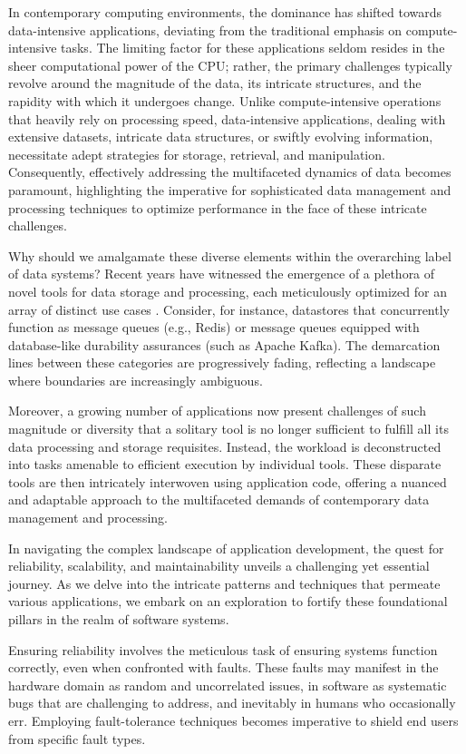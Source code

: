 
In contemporary computing environments, the dominance has shifted towards data-intensive applications, deviating from the traditional emphasis on compute-intensive tasks. The limiting factor for these applications seldom resides in the sheer computational power of the CPU; rather, the primary challenges typically revolve around the magnitude of the data, its intricate structures, and the rapidity with which it undergoes change. Unlike compute-intensive operations that heavily rely on processing speed, data-intensive applications, dealing with extensive datasets, intricate data structures, or swiftly evolving information, necessitate adept strategies for storage, retrieval, and manipulation. Consequently, effectively addressing the multifaceted dynamics of data becomes paramount, highlighting the imperative for sophisticated data management and processing techniques to optimize performance in the face of these intricate challenges.

Why should we amalgamate these diverse elements within the overarching label of data systems? Recent years have witnessed the emergence of a plethora of novel tools for data storage and processing, each meticulously optimized for an array of distinct use cases \cite{stonebraker2005onesize}. Consider, for instance, datastores that concurrently function as message queues (e.g., Redis) or message queues equipped with database-like durability assurances (such as Apache Kafka). The demarcation lines between these categories are progressively fading, reflecting a landscape where boundaries are increasingly ambiguous.

Moreover, a growing number of applications now present challenges of such magnitude or diversity that a solitary tool is no longer sufficient to fulfill all its data processing and storage requisites. Instead, the workload is deconstructed into tasks amenable to efficient execution by individual tools. These disparate tools are then intricately interwoven using application code, offering a nuanced and adaptable approach to the multifaceted demands of contemporary data management and processing.

In navigating the complex landscape of application development, the quest for reliability, scalability, and maintainability unveils a challenging yet essential journey. As we delve into the intricate patterns and techniques that permeate various applications, we embark on an exploration to fortify these foundational pillars in the realm of software systems.

Ensuring reliability involves the meticulous task of ensuring systems function correctly, even when confronted with faults. These faults may manifest in the hardware domain as random and uncorrelated issues, in software as systematic bugs that are challenging to address, and inevitably in humans who occasionally err. Employing fault-tolerance techniques becomes imperative to shield end users from specific fault types.

